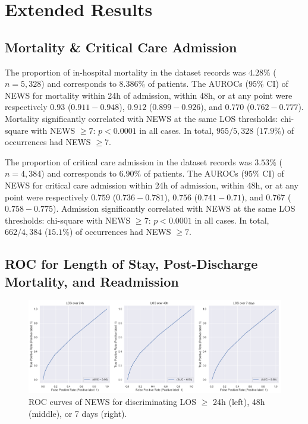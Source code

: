 \documentclass[10pt,journal, compsoc]{IEEEtran}
\begin{document}
\section{Extended Results}
\label{appendix:criticalevent_breakdown}
\subsection{Mortality \& Critical Care Admission}
The proportion of in-hospital mortality in the dataset records was $4.28\%$ ($n=5,328$) and corresponds to $8.386\%$ of patients. The AUROCs ($95\%$ CI) of NEWS for mortality within 24h of admission, within 48h, or at any point were respectively $0.93$ ($0.911-0.948$), $0.912$ ($0.899-0.926$), and $0.770$ ($0.762-0.777$). Mortality significantly correlated with NEWS at the same LOS thresholds: chi-square with NEWS $\geq 7$: $p < 0.0001$ in all cases. In total, $955/5,328$ ($17.9\%$) of occurrences had NEWS $\geq 7$.

The proportion of critical care admission in the dataset records was $3.53\%$ ($n=4,384$) and corresponds to $6.90\%$ of patients. The AUROCs ($95\%$ CI) of NEWS for critical care admission within 24h of admission, within 48h, or at any point were respectively $0.759$ ($0.736-0.781$), $0.756$ ($0.741-0.71$), and $0.767$ ($0.758-0.775$). Admission significantly correlated with NEWS at the same LOS thresholds: chi-square with NEWS $\geq 7$: $p < 0.0001$ in all cases. In total, $662/4,384$ ($15.1\%$) of occurrences had NEWS $\geq 7$.

\subsection{ROC for Length of Stay, Post-Discharge Mortality, and Readmission}
\label{appendix:rocplots}
\begin{figure}[htbp]
    \centering
    \includegraphics[width=\textwidth]{img/los_roc.png}
    \caption{ROC curves of NEWS for discriminating LOS $\geq$ 24h (left), 48h (middle), or 7 days (right).}
    \label{fig:los_roc}
\end{figure}
\end{document}
